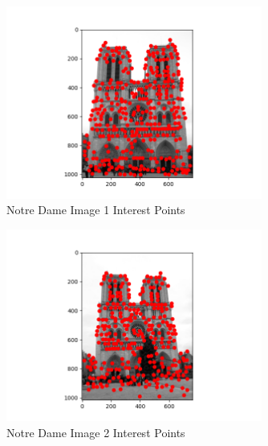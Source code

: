 \documentclass{article}
\begin{document}
\begin{figure}[H] %
    \centering
    \includegraphics[width=0.75\textwidth]{images/notre_dame_figure_1_points.png} %
    \caption{Notre Dame Image 1 Interest Points}
    \label{fig:n_dame_1}
\end{figure}

\begin{figure}[H] %
    \centering
    \includegraphics[width=0.75\textwidth]{images/notre_dame_figure_2_points.png} %
    \caption{Notre Dame Image 2 Interest Points}
    \label{fig:n_dame_2}
\end{figure}
\end{document}
